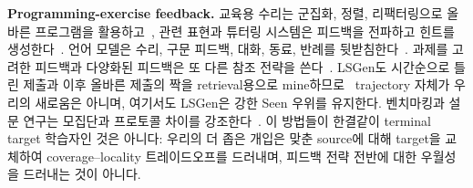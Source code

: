 \documentclass[10pt,conference]{IEEEtran}
\begin{document}
\noindent\textbf{Programming-exercise feedback.} 교육용 수리는 군집화, 정렬, 리팩터링으로 올바른 프로그램을 활용하고~\cite{gulwani2018automated,wang2018search,hu2020re}, 관련 표현과 튜터링 시스템은 피드백을 전파하고 힌트를 생성한다~\cite{piech2015embeddings,glassman2015overcode,rivers2017datadriven,price2017isnap}. 언어 모델은 수리, 구문 피드백, 대화, 동료, 반례를 뒷받침한다~\cite{joshi2023repair,zhang2024pydex,phung2023generating,liu2024fastfixer,yang2024cref,zhao2024peer,orvalho2025counterexample}. 과제를 고려한 피드백과 다양화된 피드백은 또 다른 참조 전략을 쓴다~\cite{heo2023referent,choi2021automated,choi2025automated}. LSGen도 시간순으로 틀린 제출과 이후 올바른 제출의 짝을 retrieval용으로 mine하므로~\cite{dai2026learner} trajectory 자체가 우리의 새로움은 아니며, 여기서도 LSGen은 강한 Seen 우위를 유지한다. 벤치마킹과 설문 연구는 모집단과 프로토콜 차이를 강조한다~\cite{yi2017feasibility,koutcheme2024benchmarking,keuning2018systematic}. 이 방법들이 한결같이 terminal target 학습자인 것은 아니다: 우리의 더 좁은 개입은 맞춘 source에 대해 target을 교체하여 coverage--locality 트레이드오프를 드러내며, 피드백 전략 전반에 대한 우월성을 드러내는 것이 아니다.
\end{document}
